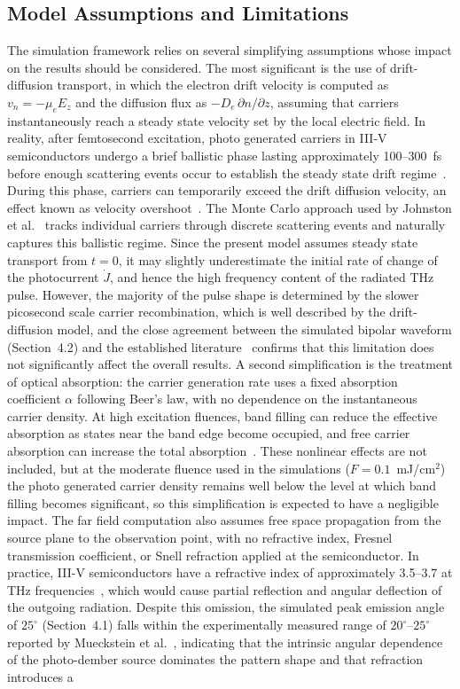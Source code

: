\documentclass[12pt]{final_project_report}
\begin{document}
\subsection{Model Assumptions and Limitations}
The simulation framework relies on several simplifying assumptions whose impact on the results should be considered. The most significant is the use of drift-diffusion transport, in which the electron drift velocity is computed as $v_n = -\mu_e E_z$ and the diffusion flux as $-D_e\,\partial n/\partial z$, assuming that carriers instantaneously reach a steady state velocity set by the local electric field. In reality, after femtosecond excitation, photo generated carriers in III-V semiconductors undergo a brief ballistic phase lasting approximately 100--300~fs before enough scattering events occur to establish the steady state drift regime~\cite{Lu2022}. During this phase, carriers can temporarily exceed the drift diffusion velocity, an effect known as velocity overshoot~\cite{Malevich2021}. The Monte Carlo approach used by Johnston et al.~\cite{SimulationTHz} tracks individual carriers through discrete scattering events and naturally captures this ballistic regime. Since the present model assumes steady state transport from $t = 0$, it may slightly underestimate the initial rate of change of the photocurrent $\dot{J}$, and hence the high frequency content of the radiated THz pulse. However, the majority of the pulse shape is determined by the slower picosecond scale carrier recombination, which is well described by the drift-diffusion model, and the close agreement between the simulated bipolar waveform (Section~4.2) and the established literature~\cite{SimulationTHz,auston_picosecond_1984} confirms that this limitation does not significantly affect the overall results. A second simplification is the treatment of optical absorption: the carrier generation rate uses a fixed absorption coefficient $\alpha$ following Beer's law, with no dependence on the instantaneous carrier density. At high excitation fluences, band filling can reduce the effective absorption as states near the band edge become occupied, and free carrier absorption can increase the total absorption~\cite{Pettine2023}. These nonlinear effects are not included, but at the moderate fluence used in the simulations ($F = 0.1$~mJ/cm$^2$) the photo generated carrier density remains well below the level at which band filling becomes significant, so this simplification is expected to have a negligible impact. The far field computation also assumes free space propagation from the source plane to the observation point, with no refractive index, Fresnel transmission coefficient, or Snell refraction applied at the semiconductor. In practice, III-V semiconductors have a refractive index of approximately 3.5--3.7 at THz frequencies~\cite{Wu2024}, which would cause partial reflection and angular deflection of the outgoing radiation. Despite this omission, the simulated peak emission angle of $25^\circ$ (Section~4.1) falls within the experimentally measured range of $20^\circ$--$25^\circ$ reported by Mueckstein et al.~\cite{Mueckstein2015}, indicating that the intrinsic angular dependence of the photo-dember source dominates the pattern shape and that refraction introduces a 
\end{document}
